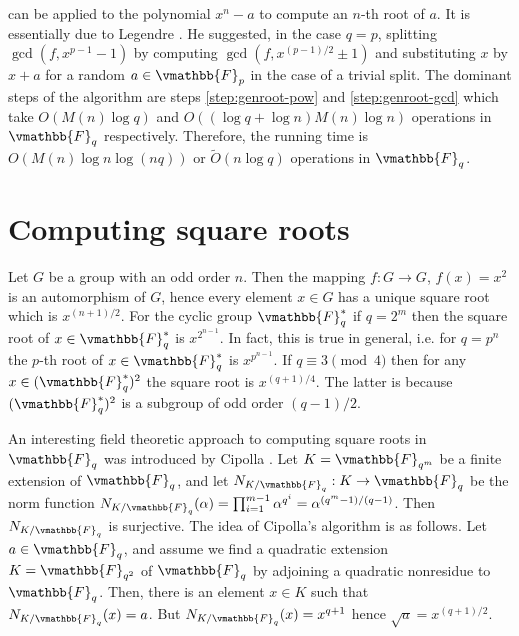  can be applied to the polynomial $x^n - a$ to compute an $n$-th root 
of $a$. It is essentially due to Legendre \cite{Legendre1785}. He suggested, in the case $q = p$, 
splitting $\gcd(f, x^{p - 1} - 1)$ by computing $\gcd(f, x^{(p - 1) / 2} \pm 1)$ and substituting 
$x$ by $x + a$ for a random $a \in \vmathbb{F}_p$ in the case of a trivial split. The dominant steps 
of the algorithm are steps \ref{step:genroot-pow} and \ref{step:genroot-gcd} which take 
$O(M(n)\log{q})$ and $O((\log{q} + \log{n})M(n)\log{n})$ operations in $\vmathbb{F}_q$ respectively. 
Therefore, the running time is $O(M(n)\log{n}\log(nq))$ or $\tilde{O}(n\log{q})$ operations in 
$\vmathbb{F}_q$.








\section{Computing square roots}
\label{section:squareroot}

Let $G$ be a group with an odd order $n$. Then the mapping $f: G \rightarrow G$, $f(x) = x^2$ is an 
automorphism of $G$, hence every element $x \in G$ has a unique square root which is $x^{(n + 
1)/2}$. For the cyclic group $\vmathbb{F}_q^*$ if $q = 2^m$ then the square root of $x \in 
\vmathbb{F}_q^*$ is $x^{2^{n - 1}}$. In fact, this is true in general, i.e. for $q = p^n$ the $p$-th 
root of $x \in \vmathbb{F}_q^*$ is $x^{p^{n - 1}}$. If $q \equiv 3 \pmod 4$ then for any $x \in 
(\vmathbb{F}_q^*)^2$ the square root is $x^{(q + 1) / 4}$. The latter is because $(\vmathbb{F}_q^*)^2$ 
is a subgroup of odd order $(q - 1) / 2$.

An interesting field theoretic approach to computing square roots in $\vmathbb{F}_q$ was introduced 
by Cipolla \cite{Cipolla1903}. Let $K = \vmathbb{F}_{q^m}$ be a finite extension of $\vmathbb{F}_q$, 
and let $N_{K/\vmathbb{F}_q}: K \rightarrow \vmathbb{F}_q$ be the norm function 
$N_{K/\vmathbb{F}_q}(\alpha) = \prod_{i = 1}^{m - 1}\alpha^{q^i} = \alpha^{(q^m - 1)/(q - 1)}$. Then 
$N_{K/\vmathbb{F}_q}$ is surjective. The idea of Cipolla's algorithm is as follows. Let $a \in 
\vmathbb{F}_q$, and assume we find a quadratic extension $K = \vmathbb{F}_{q^2}$ of $\vmathbb{F}_q$ by 
adjoining a quadratic nonresidue to $\vmathbb{F}_q$. Then, there is an element $x \in K$ such that 
$N_{K/\vmathbb{F}_q}(x) = a$. But $N_{K/\vmathbb{F}_q}(x) = x^{q + 1}$ hence $\sqrt{a} = x^{(q + 1) / 
2}$.


